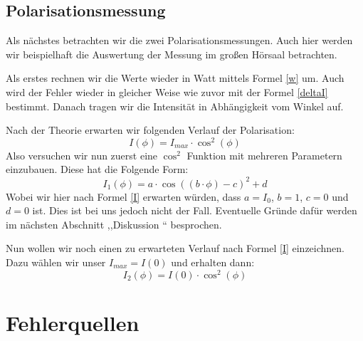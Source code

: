 \documentclass[titlepage,11pt,a4paper,ngerman]{article}
\begin{document}
\subsection{Polarisationsmessung}

Als nächstes betrachten wir die zwei Polarisationsmessungen. Auch hier werden wir beispielhaft die Auswertung der Messung im großen Hörsaal betrachten. \par 
Als erstes rechnen wir die Werte wieder in Watt mittels Formel \eqref{w} um. Auch wird der Fehler wieder in gleicher Weise wie zuvor mit der Formel \eqref{deltaI} bestimmt. Danach tragen wir die Intensität in Abhängigkeit vom Winkel auf. \par 
Nach der Theorie erwarten wir folgenden Verlauf der Polarisation:
\begin{equation}
I(\phi) = I_{max}\cdot \cos^{2}(\phi)
\label{I}
\end{equation}
Also versuchen wir nun zuerst eine $\cos^{2}$ Funktion mit mehreren Parametern einzubauen. Diese hat die Folgende Form: 
\begin{equation}
I_{1}(\phi) = a \cdot \cos((b \cdot\phi) - c)^{2} + d
\label{I1}
\end{equation}
Wobei wir hier nach Formel \eqref{I} erwarten würden, dass $a=I_{0}$, $b=1$, $c=0$ und $d=0$ ist. Dies ist bei uns jedoch nicht der Fall. Eventuelle Gründe dafür werden im nächsten Abschnitt ,,Diskussion `` besprochen. \par 
Nun wollen wir noch einen zu erwarteten Verlauf nach Formel \eqref{I} einzeichnen. Dazu wählen wir unser $I_{max}=I(0)$ und erhalten dann:
\begin{equation}
I_{2}(\phi) = I(0)\cdot \cos^{2}(\phi)
\end{equation}



\section{Fehlerquellen}
\end{document}
